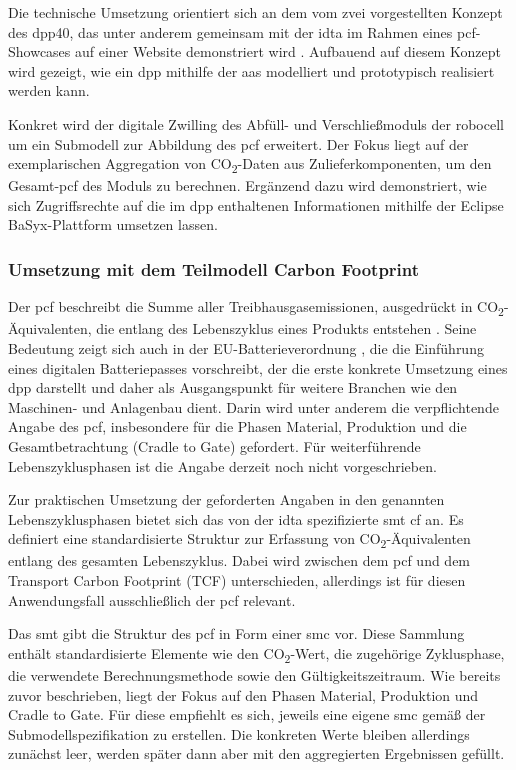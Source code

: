 Die technische Umsetzung orientiert sich an dem vom \acs{zvei} vorgestellten Konzept des \acs{dpp40}, das unter anderem gemeinsam mit der \acs{idta} im Rahmen eines \acs{pcf}-Showcases auf einer Website demonstriert wird \cite{PCFShowcas}.
Aufbauend auf diesem Konzept wird gezeigt, wie ein \acs{dpp} mithilfe der \acs{aas} modelliert und prototypisch realisiert werden kann.

Konkret wird der digitale Zwilling des Abfüll- und Verschließmoduls der robocell um ein Submodell zur Abbildung des \acs{pcf} erweitert. 
Der Fokus liegt auf der exemplarischen Aggregation von CO\textsubscript{2}-Daten aus Zulieferkomponenten, um den Gesamt-\acs{pcf} des Moduls zu berechnen. 
Ergänzend dazu wird demonstriert, wie sich Zugriffsrechte auf die im \acs{dpp} enthaltenen Informationen mithilfe der Eclipse BaSyx-Plattform umsetzen lassen.

\subsubsection{Umsetzung mit dem Teilmodell Carbon Footprint}
Der \acs{pcf} beschreibt die Summe aller Treibhausgasemissionen, ausgedrückt in CO\textsubscript{2}-Äqui\-valenten, die entlang des Lebenszyklus eines Produkts entstehen \cite{PCF}. 
Seine Bedeutung zeigt sich auch in der EU-Batterieverordnung \cite{EUVerordnung}, die die Einführung eines digitalen Batteriepasses vorschreibt, der die erste konkrete Umsetzung eines \acs{dpp} darstellt und daher als Ausgangspunkt für weitere Branchen wie den Maschinen- und Anlagenbau dient.
Darin wird unter anderem die verpflichtende Angabe des \acs{pcf}, insbesondere für die Phasen Material, Produktion und die Gesamtbetrachtung (Cradle to Gate) gefordert. 
Für weiterführende Lebenszyklusphasen ist die Angabe derzeit noch nicht vorgeschrieben.

Zur praktischen Umsetzung der geforderten Angaben in den genannten Lebenszyklusphasen bietet sich das von der \acs{idta} spezifizierte \acs{smt} \acs{cf} \cite{SpezifikaitonPCF} an.
Es definiert eine standardisierte Struktur zur Erfassung von CO\textsubscript{2}-Äquivalenten entlang des gesamten Lebenszyklus.  
Dabei wird zwischen dem \acs{pcf} und dem Transport Carbon Footprint (TCF) unterschieden, allerdings ist für diesen Anwendungsfall ausschließlich der \acs{pcf} relevant.

Das \acs{smt} gibt die Struktur des \acs{pcf} in Form einer \acs{smc} vor.  
Diese Sammlung enthält standardisierte Elemente wie den CO\textsubscript{2}-Wert, die zugehörige Zyklusphase, die verwendete Berechnungsmethode sowie den Gültigkeitszeitraum.
Wie bereits zuvor beschrieben, liegt der Fokus auf den Phasen Material, Produktion und Cradle to Gate.  
Für diese empfiehlt es sich, jeweils eine eigene \acs{smc} gemäß der Submodellspezifikation zu erstellen.  
Die konkreten Werte bleiben allerdings zunächst leer, werden später dann aber mit den aggregierten Ergebnissen gefüllt.

